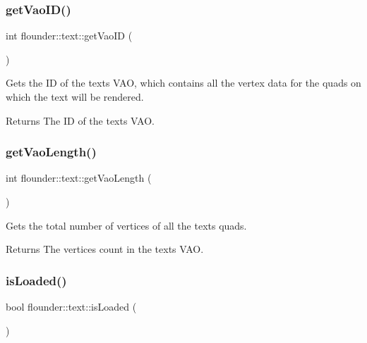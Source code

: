 \subsubsection{\texorpdfstring{get\+Vao\+I\+D()}{getVaoID()}}
{\footnotesize\ttfamily int flounder\+::text\+::get\+Vao\+ID (\begin{DoxyParamCaption}{ }\end{DoxyParamCaption})\hspace{0.3cm}{\ttfamily [inline]}}



Gets the ID of the text\textquotesingle{}s V\+AO, which contains all the vertex data for the quads on which the text will be rendered. 

\begin{DoxyReturn}{Returns}
The ID of the text\textquotesingle{}s V\+AO. 
\end{DoxyReturn}
\mbox{\label{classflounder_1_1text_a06b2e74368ca11987c9ad8555ee003ca}} 
\subsubsection{\texorpdfstring{get\+Vao\+Length()}{getVaoLength()}}
{\footnotesize\ttfamily int flounder\+::text\+::get\+Vao\+Length (\begin{DoxyParamCaption}{ }\end{DoxyParamCaption})\hspace{0.3cm}{\ttfamily [inline]}}



Gets the total number of vertices of all the text\textquotesingle{}s quads. 

\begin{DoxyReturn}{Returns}
The vertices count in the text\textquotesingle{}s V\+AO. 
\end{DoxyReturn}
\mbox{\label{classflounder_1_1text_adb04bc6937cf7d117c489947bbff7635}} 
\subsubsection{\texorpdfstring{is\+Loaded()}{isLoaded()}}
{\footnotesize\ttfamily bool flounder\+::text\+::is\+Loaded (\begin{DoxyParamCaption}{ }\end{DoxyParamCaption})}



